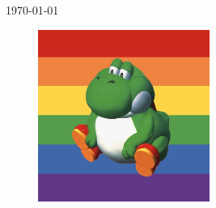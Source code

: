 \begin{titlepage}
    
    {\large \today}\\[2cm] %
    
    \begin{figure}[H]
        \centering
        \includegraphics[width=0.5\textwidth]{images/pride-yoshi.jpg}
    \end{figure}

    \vfill %

 
\end{titlepage}
    
